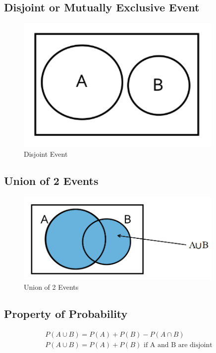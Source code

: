 \documentclass{article}
\begin{document}
    \subsection*{Disjoint or Mutually Exclusive Event}
        \begin{figure}[H]
            \centering
            \includegraphics[width=10cm]{figures/disjoint.PNG}
            \caption{Disjoint Event}
            \label{fig:disjoint}
        \end{figure}
   
    \subsection*{Union of 2 Events}
        \begin{figure}[H]
            \centering
            \includegraphics[width=10cm]{figures/union.PNG}
            \caption{Union of 2 Events}
            \label{fig:union}
        \end{figure}
 

    \subsection*{Property of Probability}
    \begin{align*}
        P(A\cup B) = P(A) + P(B) - P(A\cap B)\\
        P(A\cup B) = P(A) + P(B) \text{ if A and B are disjoint}\\
    \end{align*}
\end{document}
